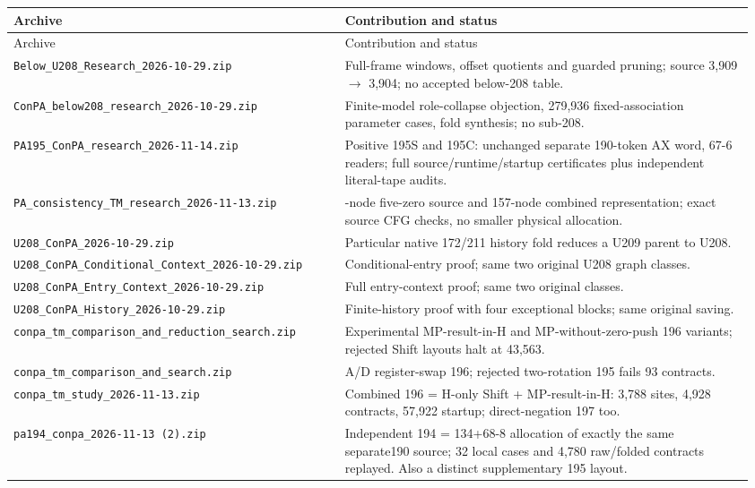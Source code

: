 \begingroup\footnotesize
\begin{longtable}{@{}>{\raggedright\arraybackslash}p{0.43\linewidth}>{\raggedright\arraybackslash}p{0.53\linewidth}@{}}
\toprule Archive & Contribution and status\\\midrule\endfirsthead
\toprule Archive & Contribution and status\\\midrule\endhead
\bottomrule\endfoot
\nolinkurl{Below_U208_Research_2026-10-29.zip} & Full-frame windows, offset quotients and guarded pruning; source 3,909 $\to$ 3,904; no accepted below-208 table.\\[4pt]
\nolinkurl{ConPA_below208_research_2026-10-29.zip} & Finite-model role-collapse objection, 279,936 fixed-association parameter cases, fold synthesis; no sub-208.\\[4pt]
\nolinkurl{PA195_ConPA_research_2026-11-14.zip} & Positive 195S and 195C: unchanged separate 190-token AX word, 67-6 readers; full source/runtime/startup certificates plus independent literal-tape audits.\\[4pt]
\nolinkurl{PA_consistency_TM_research_2026-11-13.zip} & 159-node five-zero source and 157-node combined representation; exact source CFG checks, no smaller physical allocation.\\[4pt]
\nolinkurl{U208_ConPA_2026-10-29.zip} & Particular native 172/211 history fold reduces a U209 parent to U208.\\[4pt]
\nolinkurl{U208_ConPA_Conditional_Context_2026-10-29.zip} & Conditional-entry proof; same two original U208 graph classes.\\[4pt]
\nolinkurl{U208_ConPA_Entry_Context_2026-10-29.zip} & Full entry-context proof; same two original classes.\\[4pt]
\nolinkurl{U208_ConPA_History_2026-10-29.zip} & Finite-history proof with four exceptional blocks; same original saving.\\[4pt]
\nolinkurl{conpa_tm_comparison_and_reduction_search.zip} & Experimental MP-result-in-H and MP-without-zero-push 196 variants; rejected Shift layouts halt at 43,563.\\[4pt]
\nolinkurl{conpa_tm_comparison_and_search.zip} & A/D register-swap 196; rejected two-rotation 195 fails 93 contracts.\\[4pt]
\nolinkurl{conpa_tm_study_2026-11-13.zip} & Combined 196 = H-only Shift + MP-result-in-H: 3,788 sites, 4,928 contracts, 57,922 startup; direct-negation 197 too.\\[4pt]
\nolinkurl{pa194_conpa_2026-11-13 (2).zip} & Independent 194 = 134+68-8 allocation of exactly the same separate190 source; 32 local cases and 4,780 raw/folded contracts replayed. Also a distinct supplementary 195 layout.\\[4pt]

\end{longtable}
